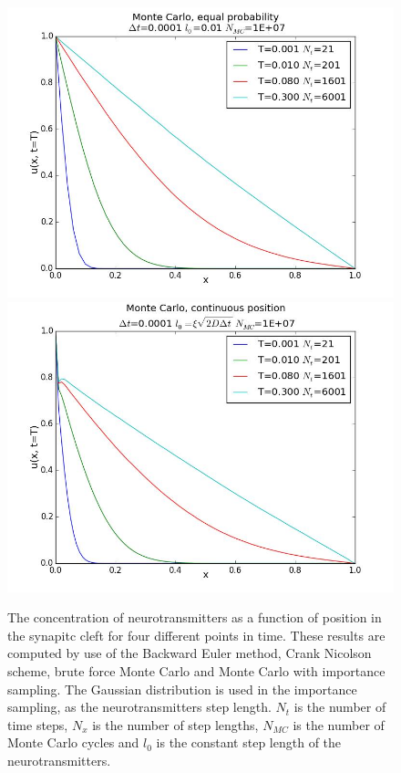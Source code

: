 \documentclass[12pt]{article}
\begin{document}
\begin{flushleft}
\begin{figure}[!h]
    \begin{minipage}{\linewidth}
    \centering
    {\includegraphics[scale=0.27]{MC}}
     {\includegraphics[scale=0.27]{MC_importance}}
    \caption{The concentration of neurotransmitters as a function of position in the synapitc cleft for four different points in time. These results are computed by use of the Backward Euler method, Crank Nicolson scheme, brute force Monte Carlo and Monte Carlo with importance sampling. The Gaussian distribution is used in the importance sampling, as the neurotransmitters step length. $N_t$ is the number of time steps, $N_x$ is the number of step lengths, $N_{MC}$ is the number of Monte Carlo cycles and $l_0$ is the constant step length of the neurotransmitters.}
  \end{minipage}
\end{figure}



\end{flushleft}
\end{document}
